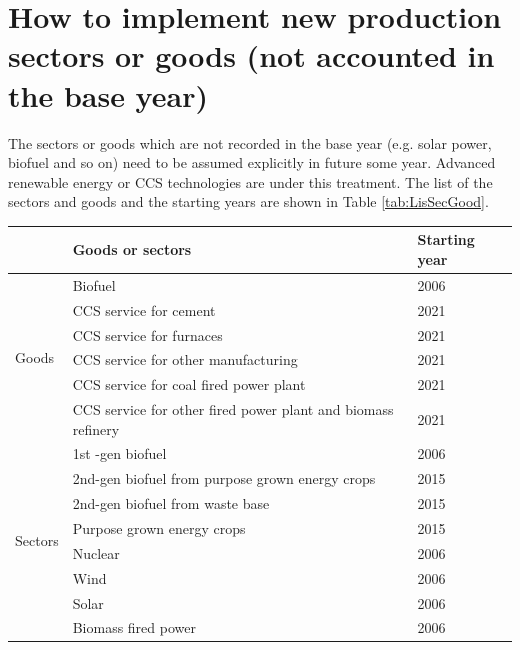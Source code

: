 \documentclass[10pt,a4paper,titlepage,dvipdfmx]{book}
\begin{document}
\section{\label{sec:HowImpNewProSec}How to implement new production sectors or goods (not accounted in the base year) }

The sectors or goods which are not recorded in the base year (e.g. solar power, biofuel and so on) need to be assumed explicitly in future some year. Advanced renewable energy or CCS technologies are under this treatment. The list of the sectors and goods and the starting years are shown in Table \ref{tab:LisSecGood}.


\begin{tabularx}{\textwidth}{|
p{}|
p{}|
p{}|} 
\caption{\label{tab:LisSecGood}List of sectors and goods which are not accounted base year, but newly introduced in the future scenarios and the starting years}\\
\hline 
 & Goods or sectors & Starting year \\\hline 
\multirow{6}{=}{Goods}  & Biofuel & 2006 \\\cline{2-3}
 & CCS service for cement & 2021 \\\cline{2-3}
 & CCS service for furnaces & 2021 \\\cline{2-3}
 & CCS service for other manufacturing & 2021 \\\cline{2-3}
 & CCS service for coal fired power plant & 2021 \\\cline{2-3}
 & CCS service for other fired power plant and biomass refinery & 2021 \\\hline 
\multirow{8}{=}{Sectors}  & 1st -gen biofuel & 2006 \\\cline{2-3}
 & 2nd-gen biofuel from purpose grown energy crops  & 2015 \\\cline{2-3}
 & 2nd-gen biofuel from waste base & 2015 \\\cline{2-3}
 & Purpose grown energy crops & 2015 \\\cline{2-3}
 & Nuclear & 2006 \\\cline{2-3}
 & Wind & 2006 \\\cline{2-3}
 & Solar & 2006 \\\cline{2-3}
 & Biomass fired power & 2006 \\\hline 
\end{tabularx}
\end{document}
